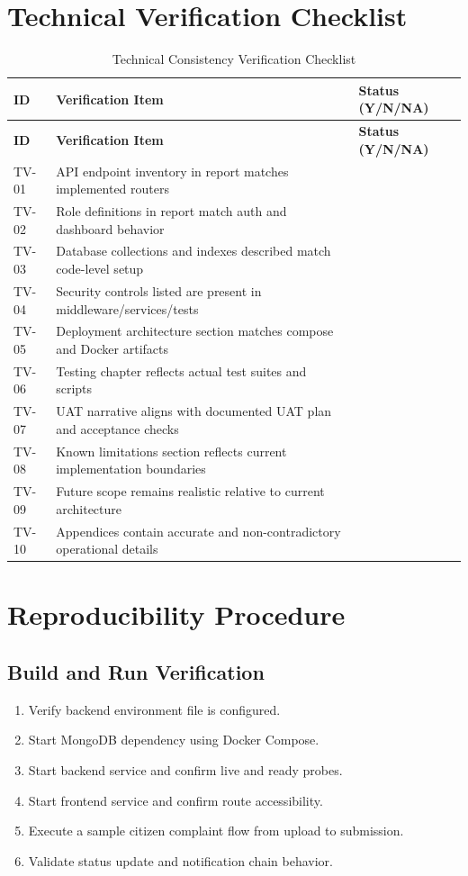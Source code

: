 \section{Technical Verification Checklist}

\begin{longtable}{|p{}|p{}|p{}|}
\caption{Technical Consistency Verification Checklist}
\toprule
\textbf{ID} & \textbf{Verification Item} & \textbf{Status (Y/N/NA)} \\
\midrule
\endfirsthead
\toprule
\textbf{ID} & \textbf{Verification Item} & \textbf{Status (Y/N/NA)} \\
\midrule
\endhead
TV-01 & API endpoint inventory in report matches implemented routers \\
TV-02 & Role definitions in report match auth and dashboard behavior \\
TV-03 & Database collections and indexes described match code-level setup \\
TV-04 & Security controls listed are present in middleware/services/tests \\
TV-05 & Deployment architecture section matches compose and Docker artifacts \\
TV-06 & Testing chapter reflects actual test suites and scripts \\
TV-07 & UAT narrative aligns with documented UAT plan and acceptance checks \\
TV-08 & Known limitations section reflects current implementation boundaries \\
TV-09 & Future scope remains realistic relative to current architecture \\
TV-10 & Appendices contain accurate and non-contradictory operational details \\
\bottomrule
\end{longtable}

\section{Reproducibility Procedure}

\subsection{Build and Run Verification}

\begin{enumerate}
\item Verify backend environment file is configured.
\item Start MongoDB dependency using Docker Compose.
\item Start backend service and confirm live and ready probes.
\item Start frontend service and confirm route accessibility.
\item Execute a sample citizen complaint flow from upload to submission.
\item Validate status update and notification chain behavior.
\end{enumerate}

